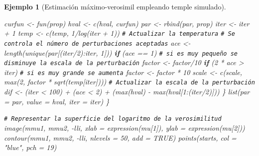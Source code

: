 \documentclass[
]{book}
\newenvironment{Shaded}{\begin{snugshade}}{\end{snugshade}}
\newcommand{\AttributeTok}[1]{\textcolor[rgb]{0.77,0.63,0.00}{#1}}
\newcommand{\CommentTok}[1]{\textcolor[rgb]{0.56,0.35,0.01}{\textit{#1}}}
\newcommand{\ConstantTok}[1]{\textcolor[rgb]{0.00,0.00,0.00}{#1}}
\newcommand{\ControlFlowTok}[1]{\textcolor[rgb]{0.13,0.29,0.53}{\textbf{#1}}}
\newcommand{\DecValTok}[1]{\textcolor[rgb]{0.00,0.00,0.81}{#1}}
\newcommand{\FunctionTok}[1]{\textcolor[rgb]{0.00,0.00,0.00}{#1}}
\newcommand{\NormalTok}[1]{#1}
\newcommand{\OtherTok}[1]{\textcolor[rgb]{0.56,0.35,0.01}{#1}}
\newcommand{\SpecialCharTok}[1]{\textcolor[rgb]{0.00,0.00,0.00}{#1}}
\newcommand{\StringTok}[1]{\textcolor[rgb]{0.31,0.60,0.02}{#1}}
\theoremstyle{break}
\newtheorem{example}{Ejemplo}[chapter]
\theoremstyle{nonumberplain}
\renewcommand{\CommentTok}[1]{\textcolor[rgb]{0.41,0.41,0.41}{\texttt{#1}}}
\begin{document}
\begin{example}[Estimación máximo-verosimil empleando temple simulado]
\begin{Shaded}
\begin{Highlighting}[]
\NormalTok{    curfun }\OtherTok{\textless{}{-}} \FunctionTok{fun}\NormalTok{(prop)}
\NormalTok{    hval }\OtherTok{\textless{}{-}} \FunctionTok{c}\NormalTok{(hval, curfun)}
\NormalTok{    par }\OtherTok{\textless{}{-}} \FunctionTok{rbind}\NormalTok{(par, prop)}
\NormalTok{    iter }\OtherTok{\textless{}{-}}\NormalTok{ iter }\SpecialCharTok{+} \DecValTok{1}
\NormalTok{    temp }\OtherTok{\textless{}{-}} \FunctionTok{c}\NormalTok{(temp, }\DecValTok{1}\SpecialCharTok{/}\FunctionTok{log}\NormalTok{(iter }\SpecialCharTok{+} \DecValTok{1}\NormalTok{))  }\CommentTok{\# Actualizar la temperatura}
    \CommentTok{\# Se controla el número de perturbaciones aceptadas}
\NormalTok{    ace }\OtherTok{\textless{}{-}} \FunctionTok{length}\NormalTok{(}\FunctionTok{unique}\NormalTok{(par[(iter}\SpecialCharTok{/}\DecValTok{2}\NormalTok{)}\SpecialCharTok{:}\NormalTok{iter, }\DecValTok{1}\NormalTok{]))}
    \ControlFlowTok{if}\NormalTok{ (ace }\SpecialCharTok{==} \DecValTok{1}\NormalTok{) }
      \CommentTok{\# si es muy pequeño se disminuye la escala de la perturbación}
\NormalTok{      factor }\OtherTok{\textless{}{-}}\NormalTok{ factor}\SpecialCharTok{/}\DecValTok{10}
    \ControlFlowTok{if}\NormalTok{ (}\DecValTok{2} \SpecialCharTok{*}\NormalTok{ ace }\SpecialCharTok{\textgreater{}}\NormalTok{ iter) }
      \CommentTok{\# si es muy grande se aumenta}
\NormalTok{      factor }\OtherTok{\textless{}{-}}\NormalTok{ factor }\SpecialCharTok{*} \DecValTok{10}
\NormalTok{    scale }\OtherTok{\textless{}{-}} \FunctionTok{c}\NormalTok{(scale, }\FunctionTok{max}\NormalTok{(}\DecValTok{2}\NormalTok{, factor }\SpecialCharTok{*} \FunctionTok{sqrt}\NormalTok{(temp[iter])))  }\CommentTok{\# Actualizar la escala de la perturbación}
\NormalTok{    dif }\OtherTok{\textless{}{-}}\NormalTok{ (iter }\SpecialCharTok{\textless{}} \DecValTok{100}\NormalTok{) }\SpecialCharTok{+}\NormalTok{ (ace }\SpecialCharTok{\textless{}} \DecValTok{2}\NormalTok{) }\SpecialCharTok{+}\NormalTok{ (}\FunctionTok{max}\NormalTok{(hval) }\SpecialCharTok{{-}} \FunctionTok{max}\NormalTok{(hval[}\DecValTok{1}\SpecialCharTok{:}\NormalTok{(iter}\SpecialCharTok{/}\DecValTok{2}\NormalTok{)]))}
\NormalTok{  \}}
  \FunctionTok{list}\NormalTok{(}\AttributeTok{par =}\NormalTok{ par, }\AttributeTok{value =}\NormalTok{ hval, }\AttributeTok{iter =}\NormalTok{ iter)}
\NormalTok{\}}

\CommentTok{\# Representar la superficie del logaritmo de la verosimilitud}
\FunctionTok{image}\NormalTok{(mmu1, mmu2, }\SpecialCharTok{{-}}\NormalTok{lli, }\AttributeTok{xlab =} \FunctionTok{expression}\NormalTok{(mu[}\DecValTok{1}\NormalTok{]), }\AttributeTok{ylab =} \FunctionTok{expression}\NormalTok{(mu[}\DecValTok{2}\NormalTok{]))}
\FunctionTok{contour}\NormalTok{(mmu1, mmu2, }\SpecialCharTok{{-}}\NormalTok{lli, }\AttributeTok{nlevels =} \DecValTok{50}\NormalTok{, }\AttributeTok{add =} \ConstantTok{TRUE}\NormalTok{)}
\FunctionTok{points}\NormalTok{(starts, }\AttributeTok{col =} \StringTok{"blue"}\NormalTok{, }\AttributeTok{pch =} \DecValTok{19}\NormalTok{)}


\end{Highlighting}
\end{Shaded}
\end{example}
\end{document}

